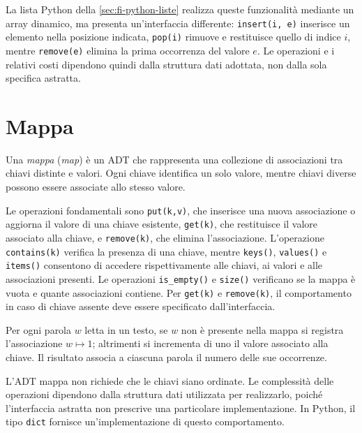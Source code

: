 La lista Python della \cref{sec:fi-python-liste} realizza
queste funzionalità mediante un array dinamico, ma presenta
un'interfaccia differente: \texttt{insert(i, e)} inserisce
un elemento nella posizione indicata, \texttt{pop(i)}
rimuove e restituisce quello di indice \(i\), mentre
\texttt{remove(e)} elimina la prima occorrenza del valore \(e\).
Le operazioni e i relativi costi dipendono quindi dalla
struttura dati adottata, non dalla sola specifica astratta.


\section{Mappa}
\label{sec:fi-adt-mappa}

\begin{definition}[Mappa]
\label{def:fi-adt-mappa}
Una \emph{mappa} (\emph{map}) è un ADT che rappresenta una
collezione di associazioni tra chiavi distinte e valori.
Ogni chiave identifica un solo valore, mentre chiavi diverse
possono essere associate allo stesso valore.
\end{definition}

Le operazioni fondamentali sono \texttt{put(k,v)}, che inserisce
una nuova associazione o aggiorna il valore di una chiave esistente,
\texttt{get(k)}, che restituisce il valore associato alla chiave,
e \texttt{remove(k)}, che elimina l'associazione.
L'operazione \texttt{contains(k)} verifica la presenza di una chiave,
mentre \texttt{keys()}, \texttt{values()} e \texttt{items()}
consentono di accedere rispettivamente alle chiavi, ai valori
e alle associazioni presenti. Le operazioni \texttt{is\_empty()}
e \texttt{size()} verificano se la mappa è vuota e quante
associazioni contiene. Per \texttt{get(k)} e \texttt{remove(k)},
il comportamento in caso di chiave assente deve essere
specificato dall'interfaccia.

\begin{example}
Per ogni parola \(w\) letta in un testo, se \(w\) non è presente
nella mappa si registra l'associazione \(w\mapsto1\); altrimenti
si incrementa di uno il valore associato alla chiave.
Il risultato associa a ciascuna parola il numero delle sue
occorrenze.
\end{example}

L'ADT mappa non richiede che le chiavi siano ordinate.
Le complessità delle operazioni dipendono dalla struttura dati
utilizzata per realizzarlo, poiché l'interfaccia astratta non
prescrive una particolare implementazione. In Python, il tipo
\texttt{dict} fornisce un'implementazione di questo comportamento.

